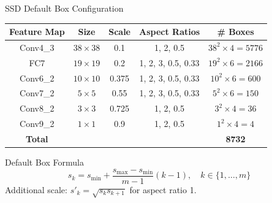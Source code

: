 \documentclass[aspectratio=169]{beamer}
\begin{document}
\begin{frame}{SSD Default Box Configuration}
  \begin{center}
  \small
  \begin{tabular}{ccccc}
    \toprule
    \textbf{Feature Map} & \textbf{Size} & \textbf{Scale} & \textbf{Aspect Ratios} & \textbf{\# Boxes}\\
    \midrule
    Conv4\_3  & $38\times38$ & 0.1   & 1, 2, 0.5              & $38^2 \times 4 = 5776$\\
    FC7       & $19\times19$ & 0.2   & 1, 2, 3, 0.5, 0.33     & $19^2 \times 6 = 2166$\\
    Conv6\_2  & $10\times10$ & 0.375 & 1, 2, 3, 0.5, 0.33     & $10^2 \times 6 = 600$\\
    Conv7\_2  & $5\times5$   & 0.55  & 1, 2, 3, 0.5, 0.33     & $5^2  \times 6 = 150$\\
    Conv8\_2  & $3\times3$   & 0.725 & 1, 2, 0.5              & $3^2  \times 4 = 36$\\
    Conv9\_2  & $1\times1$   & 0.9   & 1, 2, 0.5              & $1^2  \times 4 = 4$\\
    \midrule
    \textbf{Total} & & & & \textbf{8732}\\
    \bottomrule
  \end{tabular}
  \end{center}
  \begin{block}{Default Box Formula}
    \[
      s_k = s_{\min} + \frac{s_{\max} - s_{\min}}{m-1}(k-1), \quad k \in \{1,\ldots,m\}
    \]
    Additional scale: $s'_k = \sqrt{s_k s_{k+1}}$ for aspect ratio 1.
  \end{block}
\end{frame}
\end{document}
